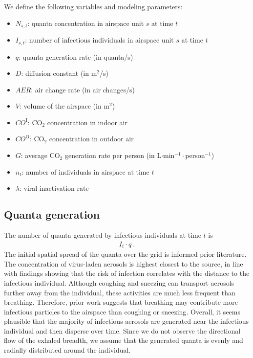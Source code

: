 \documentclass[fleqn,11pt]{wlscirep_supp}
\begin{document}
We define the following variables and modeling parameters:
\begin{itemize}
    \item $N_{s,t}$: quanta concentration in airspace unit $s$ at time $t$
    \item $I_{s,t}$: number of infectious individuals in airspace unit $s$ at time $t$
    \item $q$: quanta generation rate (in quanta/s)
    \item $D$: diffusion constant (in m$^2$/s)
    \item $AER$: air change rate (in air changes/s)
    \item $V$: volume of the airspace (in m$^2$)
    \item $CO^{\text{I}}$: CO$_2$ concentration in indoor air
    \item $CO^{\text{O}}$: CO$_2$ concentration in outdoor air
    \item $G$: average CO$_2$ generation rate per person (in L$\cdot$min$^{-1}\cdot$person$^{-1}$)
    \item $n_t$: number of individuals in airspace at time $t$
    \item $\lambda$: viral inactivation rate
\end{itemize}

\subsection{Quanta generation}\label{sec:quanta-generation}

The number of quanta generated by infectious individuals at time $t$ is 
\begin{align}\label{eq:generation}
    I_t \cdot q ~.
\end{align}
The initial spatial spread of the quanta over the grid is informed prior literature. The concentration of virus-laden aerosols is highest closest to the source\cite{Vuorinen2020SafSci,Chen2020BuildEnv}, in line with findings showing that the risk of infection correlates with the distance to the infectious individual\cite{Ko2004RiskAnal,Kenyon1996NEJM}. Although coughing and sneezing can transport aerosols further away from the individual, these activities are much less frequent than breathing. Therefore, prior work suggests that breathing may contribute more infectious particles to the airspace than coughing or sneezing\cite{Dinkele2022AJRCCM}. Overall, it seems plausible that the majority of infectious aerosols are generated near the infectious individual and then disperse over time. Since we do not observe the directional flow of the exhaled breadth, we assume that the generated quanta is evenly and radially distributed around the individual. 
\end{document}
